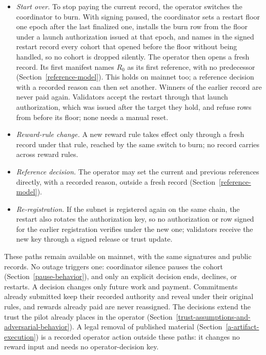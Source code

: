 \begin{itemize}
with only that cohort unpaid. A closure is declined after the cohort has
closed. When its package named a new target as the one active after it, the
next cohort's package is sealed against that target, which the coordinator
never installs; the coordinator keeps holding the earlier target, which no
later target names as its predecessor, so continuing after such a declined
closure goes through a switch to burn and a fresh record. Naming a cohort in a
switch to burn is itself that restart.
\item \emph{Start over.} To stop paying the current record, the operator switches
the coordinator to burn. With signing paused, the coordinator sets a restart
floor one epoch after the last finalized one, installs the burn row from the
floor under a launch authorization issued at that epoch, and names in the
signed restart record every cohort that opened before the floor without being
handled, so no cohort is dropped silently. The operator then opens a fresh
record. Its first manifest names \(R_0\) as its first reference, with no
predecessor (Section~\ref{reference-model}). This holds on mainnet too;
a reference decision with a recorded reason can then set another. Winners of the earlier record are never paid again. Validators accept the restart through that
launch authorization, which was issued after the target they hold, and refuse
rows from before its floor; none needs a manual reset.
\item \emph{Reward-rule change.} A new reward rule takes effect only through a
fresh record under that rule, reached by the same switch to burn; no record
carries across reward rules.
\item \emph{Reference decision.} The operator may set the current and previous
references directly, with a recorded reason, outside a fresh record
(Section~\ref{reference-model}).
\item \emph{Re-registration.} If the subnet is registered again on the same
chain, the restart also rotates the authorization key, so no authorization or
row signed for the earlier registration verifies under the new one; validators
receive the new key through a signed release or trust update.
\end{itemize}

These paths remain available on mainnet, with the same signatures and public
records. No outage triggers one: coordinator silence pauses the cohort
(Section~\ref{pause-behavior}), and only an explicit decision ends, declines, or
restarts. A decision changes only future work and payment. Commitments already
submitted keep their recorded authority and reveal under their original rules,
and rewards already paid are never reassigned. The decisions extend the trust
the pilot already places in the operator
(Section~\ref{trust-assumptions-and-adversarial-behavior}).
A legal removal of published material (Section~\ref{a-artifact-execution}) is
a recorded operator action outside these paths: it changes no reward input
and needs no operator-decision key.

